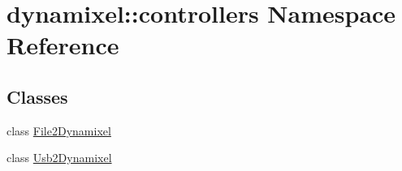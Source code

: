 \hypertarget{namespacedynamixel_1_1controllers}{}\section{dynamixel\+:\+:controllers Namespace Reference}
\label{namespacedynamixel_1_1controllers}
\subsection*{Classes}
\begin{DoxyCompactItemize}
\item 
class \hyperlink{classdynamixel_1_1controllers_1_1_file2_dynamixel}{File2\+Dynamixel}
\item 
class \hyperlink{classdynamixel_1_1controllers_1_1_usb2_dynamixel}{Usb2\+Dynamixel}
\end{DoxyCompactItemize}
